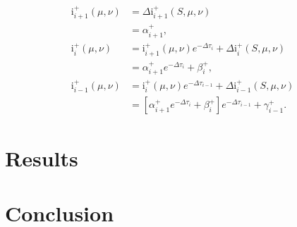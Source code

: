 \documentclass[12pt]{article}
\begin{document}
\begin{align*}
\text{i}_{i + 1}^+ (\mu, \nu)
&=
\Delta\text{i}_{i + 1}^+ (S, \mu, \nu)
\\ &=
\alpha_{i + 1}^+,
\\ \text{i}_{i}^+ (\mu, \nu)
&=
\text{i}_{i + 1}^+ (\mu, \nu) e^{-\Delta\tau_{i}} +
    \Delta\text{i}_{i}^+ (S, \mu, \nu)
\\ &=
\alpha_{i + 1}^+ e^{-\Delta\tau_{i}} + \beta_{i}^+,
\\ \text{i}_{i - 1}^+ (\mu, \nu)
&=
\text{i}_{i}^+ (\mu, \nu) e^{-\Delta\tau_{i - 1}} +
    \Delta\text{i}_{i - 1}^+ (S, \mu, \nu)
\\ &=
[\alpha_{i + 1}^+ e^{-\Delta\tau_{i}} + \beta_{i}^+] e^{-\Delta\tau_{i - 1}} +
    \gamma_{i - 1}^+.
\end{align*}

\section{Results}



\section{Conclusion}




\end{document}

